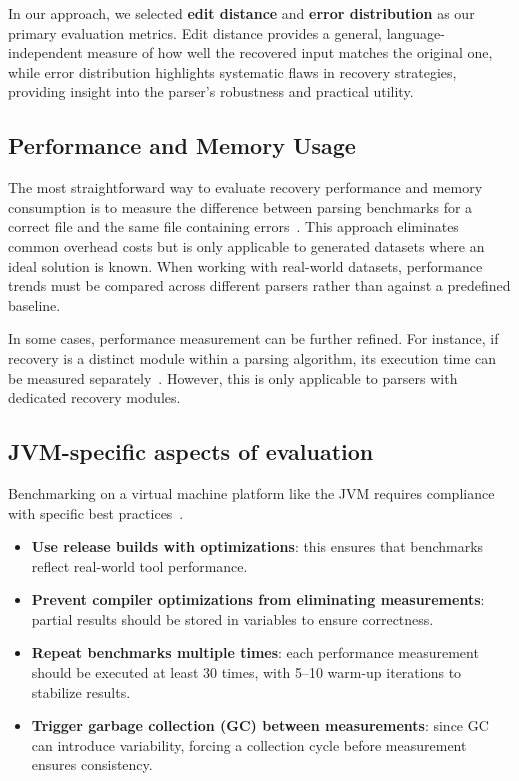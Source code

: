 \documentclass[conference]{IEEEtran}
\begin{document}
In our approach, we selected \textbf{edit distance} and \textbf{error distribution} as our primary evaluation metrics.  Edit distance provides a general, language-independent measure of how well the recovered input matches the original one, while error distribution highlights systematic flaws in recovery strategies, providing insight into the parser’s robustness and practical utility.


\subsection{Performance and Memory Usage }
The most straightforward way to evaluate recovery performance and memory consumption is to measure the difference between parsing benchmarks for a correct file and the same file containing errors~\cite{natural_recovery, fuzz_recovery}. This approach eliminates common overhead costs but is only applicable to generated datasets where an ideal solution is known.  When working with real-world datasets, performance trends must be compared across different parsers rather than against a predefined baseline.

In some cases, performance measurement can be  further refined. For instance, if recovery is a distinct module  within a parsing algorithm, its execution time can be measured separately~\cite{panic}. However, this is only applicable to parsers with dedicated recovery modules.

\subsection{JVM-specific aspects of evaluation}
Benchmarking on a virtual machine platform like the JVM requires compliance with specific best practices~\cite{bench}.

\begin{itemize}
    \item \textbf{Use release builds with optimizations}: this ensures that benchmarks reflect real-world tool performance.
    \item \textbf{Prevent compiler optimizations from eliminating measurements}: partial results should be stored in variables to ensure correctness.
    \item \textbf{Repeat benchmarks multiple times}: each performance measurement should be executed at least 30 times, with 5–10 warm-up iterations to stabilize results.
    \item \textbf{Trigger garbage collection (GC) between measurements}: since GC can introduce variability, forcing a collection cycle before measurement ensures consistency.
\end{itemize}
\end{document}
